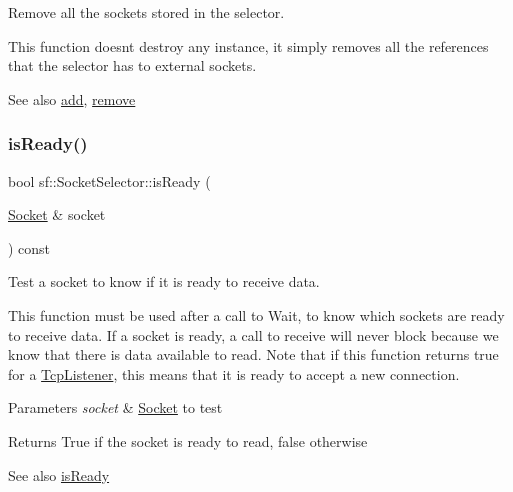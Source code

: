 Remove all the sockets stored in the selector. 

This function doesn\textquotesingle{}t destroy any instance, it simply removes all the references that the selector has to external sockets.

\begin{DoxySeeAlso}{See also}
\hyperlink{classsf_1_1_socket_selector_ade952013232802ff7b9b33668f8d2096}{add}, \hyperlink{classsf_1_1_socket_selector_a98b6ab693a65b82caa375639232357c1}{remove} 
\end{DoxySeeAlso}
\mbox{\label{classsf_1_1_socket_selector_a917a4bac708290a6782e6686fd3bf889}} 
\subsubsection{\texorpdfstring{is\+Ready()}{isReady()}}
{\footnotesize\ttfamily bool sf\+::\+Socket\+Selector\+::is\+Ready (\begin{DoxyParamCaption}\item[{\hyperlink{classsf_1_1_socket}{Socket} \&}]{socket }\end{DoxyParamCaption}) const}



Test a socket to know if it is ready to receive data. 

This function must be used after a call to Wait, to know which sockets are ready to receive data. If a socket is ready, a call to receive will never block because we know that there is data available to read. Note that if this function returns true for a \hyperlink{classsf_1_1_tcp_listener}{Tcp\+Listener}, this means that it is ready to accept a new connection.


\begin{DoxyParams}{Parameters}
{\em socket} & \hyperlink{classsf_1_1_socket}{Socket} to test\\
\hline
\end{DoxyParams}
\begin{DoxyReturn}{Returns}
True if the socket is ready to read, false otherwise
\end{DoxyReturn}
\begin{DoxySeeAlso}{See also}
\hyperlink{classsf_1_1_socket_selector_a917a4bac708290a6782e6686fd3bf889}{is\+Ready} 
\end{DoxySeeAlso}
\mbox{\label{classsf_1_1_socket_selector_ae6395c7a8d29a9ea14939cc5d1ba3a33}} 
